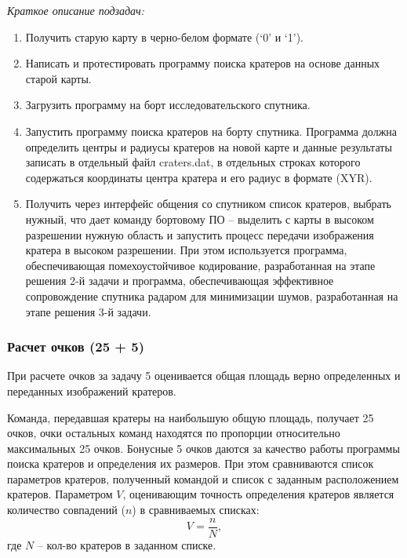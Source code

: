 \textit{Краткое описание подзадач:}
\begin{enumerate}
    \item Получить старую карту в черно-белом формате (‘0’ и ‘1’). 
    \item Написать и протестировать программу поиска кратеров на основе данных старой карты.
    \item Загрузить программу на борт исследовательского спутника.
    \item Запустить программу поиска кратеров на борту спутника. Программа должна определить центры и радиусы кратеров на новой карте и данные результаты записать в отдельный файл craters.dat, в отдельных строках которого содержаться координаты центра кратера и его радиус в формате (XYR).
    \item Получить через интерфейс общения со спутником список кратеров, выбрать нужный, что дает команду бортовому ПО – выделить с карты в высоком разрешении нужную область и запустить процесс передачи изображения кратера в высоком разрешении. При этом используется программа, обеспечивающая помехоустойчивое кодирование, разработанная на этапе решения 2-й задачи и программа, обеспечивающая эффективное сопровождение спутника радаром для минимизации шумов, разработанная на этапе решения 3-й задачи.
\end{enumerate}

\subsubsection*{Расчет очков (25 + 5)}

При расчете очков за задачу 5 оценивается общая площадь верно определенных и переданных изображений кратеров.

Команда, передавшая кратеры на наибольшую общую площадь, получает 25 очков, очки остальных команд находятся по пропорции относительно максимальных 25 очков. Бонусные 5 очков даются за качество работы программы поиска кратеров и определения их размеров. При этом сравниваются список параметров кратеров, полученный командой и список с заданным расположением кратеров. Параметром $V$, оценивающим точность определения кратеров является количество совпадений ($n$) в сравниваемых списках:
$$V = \frac{n}{N},$$
где $N$ – кол-во кратеров в заданном списке.